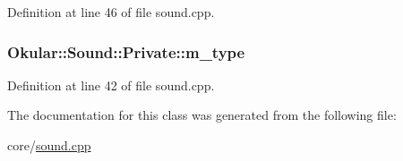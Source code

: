 Definition at line 46 of file sound.\+cpp.

\hypertarget{classSound_1_1Private_ab2ddecacdbe04eb2b02a7cea13772fe3}{
\subsubsection[{m\+\_\+type}]{ Okular\+::\+Sound\+::\+Private\+::m\+\_\+type}}\label{classSound_1_1Private_ab2ddecacdbe04eb2b02a7cea13772fe3}


Definition at line 42 of file sound.\+cpp.



The documentation for this class was generated from the following file\+:\begin{DoxyCompactItemize}
\item 
core/\hyperlink{sound_8cpp}{sound.\+cpp}\end{DoxyCompactItemize}
